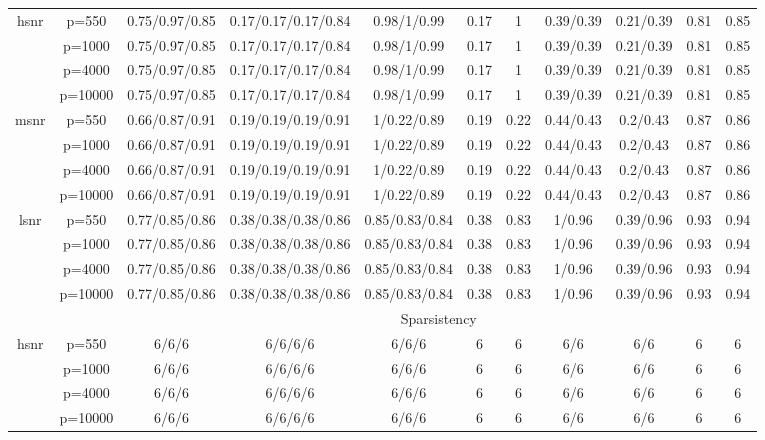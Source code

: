 \begin{table}[ht]
{\begin{tabular}{|c|c|ccccccccc|}
\midrule\multirow{4}[2]{*}{hsnr} & p=550 & 0.75/0.97/0.85 & 0.17/0.17/0.17/0.84 & 0.98/1/0.99 & 0.17 & 1 & 0.39/0.39 & 0.21/0.39 & 0.81 & 0.85 \\ 
   & p=1000 & 0.75/0.97/0.85 & 0.17/0.17/0.17/0.84 & 0.98/1/0.99 & 0.17 & 1 & 0.39/0.39 & 0.21/0.39 & 0.81 & 0.85 \\ 
   & p=4000 & 0.75/0.97/0.85 & 0.17/0.17/0.17/0.84 & 0.98/1/0.99 & 0.17 & 1 & 0.39/0.39 & 0.21/0.39 & 0.81 & 0.85 \\ 
   & p=10000 & 0.75/0.97/0.85 & 0.17/0.17/0.17/0.84 & 0.98/1/0.99 & 0.17 & 1 & 0.39/0.39 & 0.21/0.39 & 0.81 & 0.85 \\ 
  \midrule\multirow{4}[2]{*}{msnr} & p=550 & 0.66/0.87/0.91 & 0.19/0.19/0.19/0.91 & 1/0.22/0.89 & 0.19 & 0.22 & 0.44/0.43 & 0.2/0.43 & 0.87 & 0.86 \\ 
   & p=1000 & 0.66/0.87/0.91 & 0.19/0.19/0.19/0.91 & 1/0.22/0.89 & 0.19 & 0.22 & 0.44/0.43 & 0.2/0.43 & 0.87 & 0.86 \\ 
   & p=4000 & 0.66/0.87/0.91 & 0.19/0.19/0.19/0.91 & 1/0.22/0.89 & 0.19 & 0.22 & 0.44/0.43 & 0.2/0.43 & 0.87 & 0.86 \\ 
   & p=10000 & 0.66/0.87/0.91 & 0.19/0.19/0.19/0.91 & 1/0.22/0.89 & 0.19 & 0.22 & 0.44/0.43 & 0.2/0.43 & 0.87 & 0.86 \\ 
  \midrule\multirow{4}[2]{*}{lsnr} & p=550 & 0.77/0.85/0.86 & 0.38/0.38/0.38/0.86 & 0.85/0.83/0.84 & 0.38 & 0.83 & 1/0.96 & 0.39/0.96 & 0.93 & 0.94 \\ 
   & p=1000 & 0.77/0.85/0.86 & 0.38/0.38/0.38/0.86 & 0.85/0.83/0.84 & 0.38 & 0.83 & 1/0.96 & 0.39/0.96 & 0.93 & 0.94 \\ 
   & p=4000 & 0.77/0.85/0.86 & 0.38/0.38/0.38/0.86 & 0.85/0.83/0.84 & 0.38 & 0.83 & 1/0.96 & 0.39/0.96 & 0.93 & 0.94 \\ 
   & p=10000 & 0.77/0.85/0.86 & 0.38/0.38/0.38/0.86 & 0.85/0.83/0.84 & 0.38 & 0.83 & 1/0.96 & 0.39/0.96 & 0.93 & 0.94 \\ 
   \midrule 
 \multicolumn{1}{|c}{} &       & \multicolumn{9}{c|}{Sparsistency} \\
\midrule\multirow{4}[2]{*}{hsnr} & p=550 & 6/6/6 & 6/6/6/6 & 6/6/6 & 6 & 6 & 6/6 & 6/6 & 6 & 6 \\ 
   & p=1000 & 6/6/6 & 6/6/6/6 & 6/6/6 & 6 & 6 & 6/6 & 6/6 & 6 & 6 \\ 
   & p=4000 & 6/6/6 & 6/6/6/6 & 6/6/6 & 6 & 6 & 6/6 & 6/6 & 6 & 6 \\ 
   & p=10000 & 6/6/6 & 6/6/6/6 & 6/6/6 & 6 & 6 & 6/6 & 6/6 & 6 & 6 \\ 

\end{tabular}}
\end{table}
